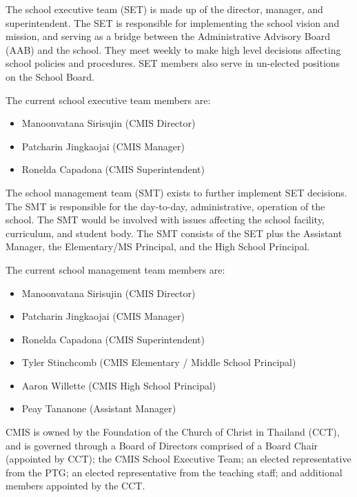 
The school executive team (SET) is made up of the director, manager, and superintendent. The SET is responsible for implementing the school vision and mission, and serving as a bridge between the Administrative Advisory Board (AAB) and the school.  They meet weekly to make high level decisions affecting school policies and procedures.  SET members also serve in un-elected positions on the School Board.  

The current school executive team members are:

\begin{itemize}
\item Manoonvatana Sirisujin (CMIS Director) 
\item Patcharin Jingkaojai (CMIS Manager) 
\item Ronelda Capadona (CMIS Superintendent) 
\end{itemize}


The school management team (SMT) exists to further implement SET decisions.  The SMT is responsible for the day-to-day, administrative, operation of the school.  The SMT would be involved with issues affecting the school facility, curriculum, and student body. The SMT consists of the SET plus the Assistant Manager, the Elementary/MS Principal, and the High School Principal. 

The current school management team members are:

\begin{itemize}
\item Manoonvatana Sirisujin (CMIS Director) 
\item Patcharin Jingkaojai (CMIS Manager) 
\item Ronelda Capadona (CMIS Superintendent)
\item Tyler Stinchcomb (CMIS Elementary / Middle School Principal)
\item Aaron Willette (CMIS High School Principal)
\item Peay Tananone (Assistant Manager)
\end{itemize}


CMIS is owned by the Foundation of the Church of Christ in Thailand (CCT), and is governed through a Board of Directors comprised of a Board Chair (appointed by CCT); the CMIS School Executive Team; an elected representative from the PTG; an elected representative from the teaching staff; and additional members appointed by the CCT.

